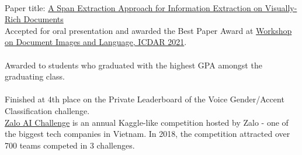 \\
Paper title: \href{https://aps.arxiv.org/abs/2106.00978}{A Span Extraction Approach for Information Extraction on Visually-Rich Documents}\\
\indent Accepted for oral presentation and awarded the Best Paper Award at \href{https://dil2021.github.io/index.html}{Workshop on Document Images and Language, ICDAR 2021}.\\

\\
Awarded to students who graduated with the highest GPA amongst the graduating class.\\

\\
Finished at 4th place on the Private Leaderboard of the Voice Gender/Accent Classification challenge.\\
\indent \href{https://challenge.zalo.ai}{Zalo AI Challenge} is an annual Kaggle-like competition hosted
by Zalo - one of the biggest tech companies in Vietnam. In 2018, the competition attracted
over 700 teams competed in 3 challenges.\\